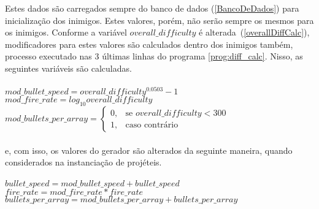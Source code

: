 Estes dados são carregados sempre do banco de dados (\ref{BancoDeDados}) para inicialização dos inimigos. Estes valores, porém, não serão sempre os mesmos para os inimigos. Conforme a variável $overall\_difficulty$ é alterada~(\ref{overallDiffCalc}), modificadores para estes valores são calculados dentro dos inimigos também, processo executado nas 3 últimas linhas do programa \ref{prog:diff_calc}. Nisso, as seguintes variáveis são calculadas.\\
\\
$mod\_bullet\_speed = overall\_difficulty^{0.0503} - 1$\\
$mod\_fire\_rate = log_{10} overall\_difficulty$\\
$mod\_bullets\_per\_array =  \begin{cases}
                                0,& \text{se } overall\_difficulty < 300\\
                                1,              & \text{caso contrário}
                            \end{cases}$\\
\\
e, com isso, os valores do gerador são alterados da seguinte maneira, quando considerados na instanciação de projéteis.\\
\\
$bullet\_speed = mod\_bullet\_speed + bullet\_speed$\\
$fire\_rate = mod\_fire\_rate * fire\_rate$\\
$bullets\_per\_array = mod\_bullets\_per\_array + bullets\_per\_array$
